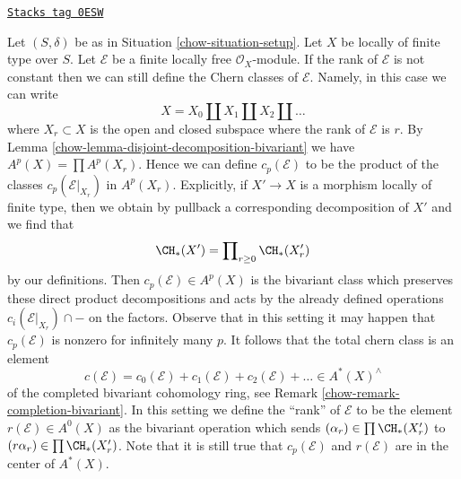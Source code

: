 \begin{remark}
\label{chow-remark-extend-to-finite-locally-free}
\href{https://stacks.math.columbia.edu/tag/0ESW}{\texttt{Stacks tag 0ESW}}

Let $(S, \delta)$ be as in Situation \ref{chow-situation-setup}.
Let $X$ be locally of finite type over $S$.
Let $\mathcal{E}$ be a finite locally free $\mathcal{O}_X$-module.
If the rank of $\mathcal{E}$ is not constant then we can
still define the Chern classes of $\mathcal{E}$. Namely, in this
case we can write
$$
X = X_0 \amalg X_1 \amalg X_2 \amalg \ldots
$$
where $X_r \subset X$ is the open and closed subspace where
the rank of $\mathcal{E}$ is $r$. By
Lemma \ref{chow-lemma-disjoint-decomposition-bivariant}
we have $A^p(X) = \prod A^p(X_r)$.
Hence we can define $c_p(\mathcal{E})$ to be the
product of the classes $c_p(\mathcal{E}|_{X_r})$ in $A^p(X_r)$.
Explicitly, if $X' \to X$ is a morphism locally of finite type,
then we obtain by pullback a corresponding decomposition of $X'$
and we find that
$$
\CH_*(X') = \prod\nolimits_{r \geq 0} \CH_*(X'_r)
$$
by our definitions. Then $c_p(\mathcal{E}) \in A^p(X)$
is the bivariant class which preserves these direct
product decompositions and acts by the already defined
operations $c_i(\mathcal{E}|_{X_r}) \cap -$
on the factors. Observe that in this setting it may happen
that $c_p(\mathcal{E})$ is nonzero for infinitely many $p$.
It follows that the total chern class is an element
$$
c(\mathcal{E}) =
c_0(\mathcal{E}) + c_1(\mathcal{E}) + c_2(\mathcal{E}) + \ldots
\in A^*(X)^\wedge
$$
of the completed bivariant cohomology ring, see
Remark \ref{chow-remark-completion-bivariant}.
In this setting we define the ``rank'' of $\mathcal{E}$
to be the element $r(\mathcal{E}) \in A^0(X)$
as the bivariant operation which sends $(\alpha_r) \in \prod \CH_*(X'_r)$
to $(r\alpha_r) \in \prod \CH_*(X'_r)$.
Note that it is still true that $c_p(\mathcal{E})$ and $r(\mathcal{E})$
are in the center of $A^*(X)$.
\end{remark}

